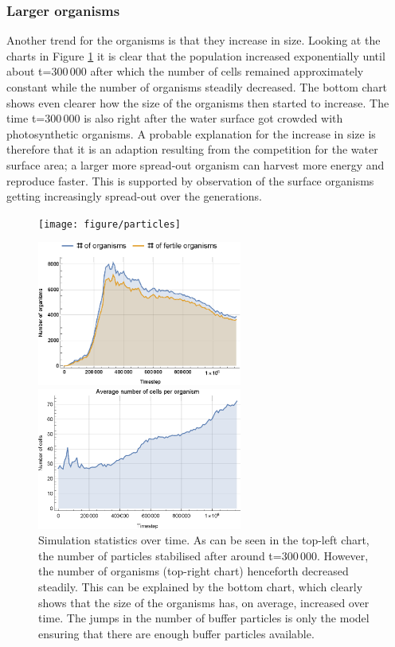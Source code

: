 \subsubsection{Larger organisms}
Another trend for the organisms is that they increase in size. Looking at the charts in Figure \ref{fig:nOrgs} it is clear that the population increased exponentially until about t=300\,000 after which the number of cells remained approximately constant while the number of organisms steadily decreased. The bottom chart shows even clearer how the size of the organisms then started to increase. The time t=300\,000 is also right after the water surface got crowded with photosynthetic organisms. A probable explanation for the increase in size is therefore that it is an adaption resulting from the competition for the water surface area; a larger more spread-out organism can harvest more energy and reproduce faster. This is supported by observation of the surface organisms getting increasingly spread-out over the generations.
\begin{figure}
  \begin{center}
  \texttt{[image: figure/particles]}
  
  \vspace{0.5cm}
  
  \includegraphics[width=0.60\textwidth]{figure/nOrgs}
  
  \vspace{0.5cm}
  
  \includegraphics[width=0.60\textwidth]{figure/nCells}
  \caption{
  Simulation statistics over time. As can be seen in the top-left chart, the number of particles stabilised after around t=300\,000. However, the number of organisms (top-right chart) henceforth decreased steadily. This can be explained by the bottom chart, which clearly shows that the size of the organisms has, on average, increased over time. The jumps in the number of buffer particles is only the model ensuring that there are enough buffer particles available.
  }
  \label{fig:nOrgs}
  \end{center}
\end{figure}

